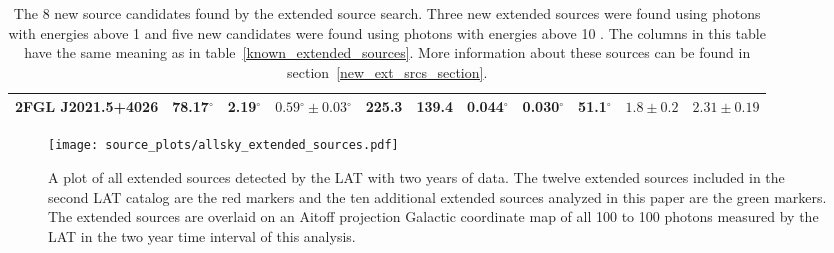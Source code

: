 \documentclass[12pt,preprint]{aastex}
\newcommand{\mev}{\text{MeV}\xspace}
\newcommand{\gev}{\text{GeV}\xspace}
\renewcommand{\deg}{\ensuremath{^\circ}\xspace}
\begin{document}
\begin{table}
\begin{centering}
\begin{tabular}{l|rrrrrrrrrr}
      2FGL J2021.5+4026    &      78.17\deg &       2.19\deg & $  0.59\deg \pm   0.03\deg$ &      225.3 &      139.4 &  0.044\deg &  0.030\deg &   51.1\deg & $    1.8 \pm     0.2$ & $   2.31 \pm    0.19$ \\
      \hline
    \end{tabular}
    \caption{The 8 new source candidates found by the extended source
    search. Three new extended sources were found using photons with
    energies above 1 \gev and five new candidates were found using photons
    with energies above 10 \gev.  The columns in this table have the same
    meaning as in table~\ref{known_extended_sources}.  More information
    about these sources can be found in section~\ref{new_ext_srcs_section}.
    }
    \label{new_ext_srcs_table}
  \end{centering}
\end{table}



\clearpage
\begin{figure}
  \begin{center}
    \texttt{[image: source\_plots/allsky\_extended\_sources.pdf]}
    \end{center}
    \caption{A plot of all \gev extended sources detected by the LAT
    with two years of data.  The twelve extended sources included in
    the second LAT catalog are the red markers and the ten additional
    extended sources analyzed in this paper are the green markers. The
    extended sources are overlaid on an Aitoff projection Galactic
    coordinate map of all 100 \mev to 100 \gev photons measured by the
    LAT in the two year time interval of this analysis.}\label{allsky_extended_sources}
  \end{figure}
\end{document}

